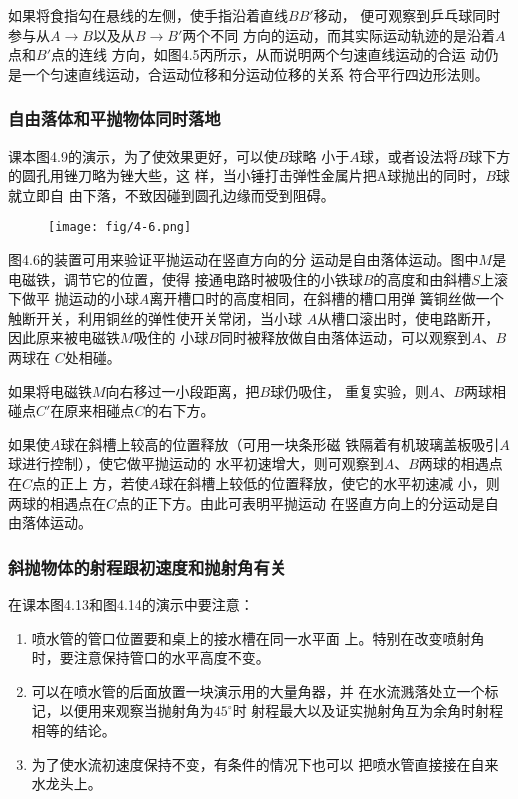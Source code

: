 如果将食指勾在悬线的左侧，使手指沿着直线$BB'$移动，
便可观察到乒乓球同时参与从$A\to B$以及从$B\to B'$两个不同
方向的运动，而其实际运动轨迹的是沿着$A$点和$B'$点的连线
方向，如图4.5丙所示，从而说明两个匀速直线运动的合运
动仍是一个匀速直线运动，合运动位移和分运动位移的关系
符合平行四边形法则。

\subsubsection{自由落体和平抛物体同时落地}
课本图4.9的演示，为了使效果更好，可以使$B$球略
小于$A$球，或者设法将$B$球下方的圆孔用锉刀略为锉大些，这
样，当小锤打击弹性金属片把A球抛出的同时，$B$球就立即自
由下落，不致因碰到圆孔边缘而受到阻碍。
\begin{figure}[htp]
    \centering
    \texttt{[image: fig/4-6.png]}
    \caption{}
\end{figure}

图4.6的装置可用来验证平抛运动在竖直方向的分
运动是自由落体运动。图中$M$是电磁铁，调节它的位置，使得
接通电路时被吸住的小铁球$B$的高度和由斜槽$S$上滚下做平
抛运动的小球$A$离开槽口时的高度相同，在斜槽的槽口用弹
簧铜丝做一个触断开关，利用铜丝的弹性使开关常闭，当小球
$A$从槽口滚出时，使电路断开，因此原来被电磁铁$M$吸住的
小球$B$同时被释放做自由落体运动，可以观察到$A$、$B$两球在
$C$处相碰。

如果将电磁铁$M$向右移过一小段距离，把$B$球仍吸住，
重复实验，则$A$、$B$两球相碰点$C'$在原来相碰点$C$的右下方。

如果使$A$球在斜槽上较高的位置释放（可用一块条形磁
铁隔着有机玻璃盖板吸引$A$球进行控制），使它做平抛运动的
水平初速增大，则可观察到$A$、$B$两球的相遇点在$C$点的正上
方，若使$A$球在斜槽上较低的位置释放，使它的水平初速减
小，则两球的相遇点在$C$点的正下方。由此可表明平抛运动
在竖直方向上的分运动是自由落体运动。

\subsubsection{斜抛物体的射程跟初速度和抛射角有关}
在课本图4.13和图4.14的演示中要注意：
\begin{enumerate}
\item 喷水管的管口位置要和桌上的接水槽在同一水平面
上。特别在改变喷射角时，要注意保持管口的水平高度不变。
\item 可以在喷水管的后面放置一块演示用的大量角器，并
在水流溅落处立一个标记，以便用来观察当抛射角为$45^{\circ}$时
射程最大以及证实抛射角互为余角时射程相等的结论。
\item 为了使水流初速度保持不变，有条件的情况下也可以
把喷水管直接接在自来水龙头上。
\end{enumerate}



